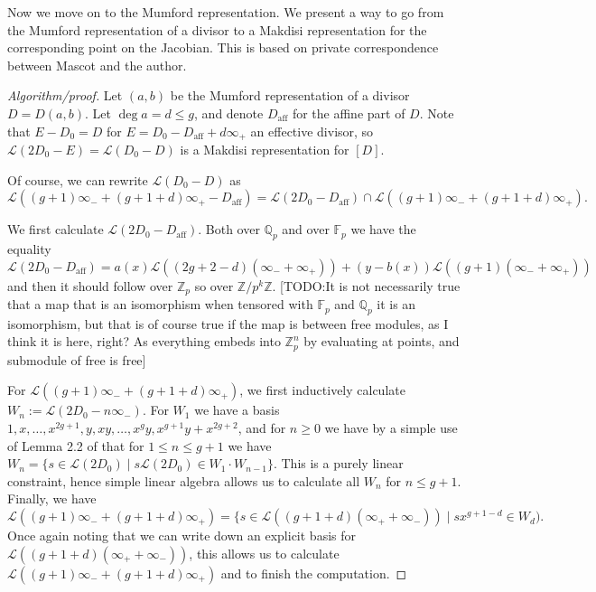 \documentclass[12pt]{article}
\newcommand{\Z}{\mathbb{Z}}
\newcommand{\Q}{\mathbb{Q}}
\newcommand{\Lcal}{\mathcal{L}}
\newcommand{\F}{\mathbb{F}}
\theoremstyle{plain}
\theoremstyle{definition}
\theoremstyle{remark}
\begin{document}
Now we move on to the Mumford representation. We present a way to go from the Mumford representation of a divisor to a Makdisi representation for the corresponding point on the Jacobian. This is based on private correspondence between Mascot and the author.
\begin{proof}[Algorithm/proof]
Let $(a,b)$ be the Mumford representation of a divisor $D = D(a,b)$. Let $\deg a = d \leq g$, and denote $D_{\text{aff}}$ for the affine part of $D$. Note that $E-D_0 = D$ for $E = D_0 - D_{\text{aff}} + d\infty_+$ an effective divisor, so $\Lcal(2D_0 - E) = \Lcal(D_0 - D)$ is a Makdisi representation for $[D]$.

Of course, we can rewrite $\Lcal(D_0 -D)$ as 
\[
\Lcal((g+1)\infty_- + (g+1+d)\infty_+ - D_{\text{aff}}) = \Lcal(2D_0 - D_{\text{aff}} ) \cap \Lcal((g+1)\infty_- + (g+1+d)\infty_+).
\]

We first calculate $\Lcal(2D_0 - D_{\text{aff}})$. Both over $\Q_p$ and over $\F_p$ we have the equality
\[
\Lcal(2D_0 - D_{\text{aff}}) = a(x)\Lcal((2g+2-d)(\infty_- + \infty_+)) + (y-b(x))\Lcal((g+1)(\infty_- + \infty_+))
\]
and then it should follow over $\Z_p$ so over $\Z/p^k\Z$. [TODO:It is not necessarily true that a map that is an isomorphism when tensored with $\F_p$ and $\Q_p$ it is an isomorphism, but that is of course true if the map is between free modules, as I think it is here, right? As everything embeds into $\Z_p^n$ by evaluating at points, and submodule of free is free] 

For $\Lcal((g+1)\infty_- + (g+1+d)\infty_+)$, we first inductively calculate $W_n := \Lcal(2D_0 - n\infty_-)$. For $W_1$ we have a basis $1,x,\dots,x^{2g+1},y,xy,\dots,x^g y, x^{g+1}y+x^{2g+2}$, and for $n \geq 0$ we have by a simple use of Lemma 2.2 of \citep{makdisi04} that for $1 \leq n \leq g+1$ we have $W_{n} = \{s \in \Lcal(2D_0) \mid s\Lcal(2D_0) \in W_1 \cdot W_{n-1}\}$. This is a purely linear constraint, hence simple linear algebra allows us to calculate all $W_n$ for $n \leq g+1$. Finally, we have
\[
\Lcal((g+1)\infty_- + (g+1+d)\infty_+) = \{ s \in \Lcal((g+1+d)(\infty_+ + \infty_-)) \mid sx^{g+1-d} \in W_d).
\] 
Once again noting that we can write down an explicit basis for $\Lcal((g+1+d)(\infty_+ + \infty_-))$, this allows us to calculate $\Lcal((g+1)\infty_- + (g+1+d)\infty_+)$ and to finish the computation.
\end{proof}
\end{document}
